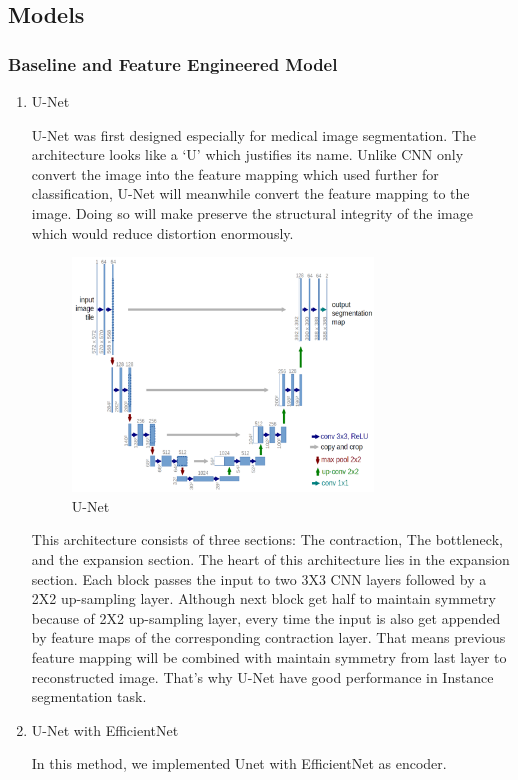 \documentclass[UTF8]{article}
\begin{document}
\subsection{Models}
	\subsubsection{Baseline and Feature Engineered Model}
	\begin{enumerate}
		\item U-Net\par
		\noindent U-Net was first designed especially for medical image segmentation. The architecture looks like a ‘U’ which justifies its name. Unlike CNN only convert the image into the feature mapping which used further for classification, U-Net will meanwhile convert the feature mapping to the image. Doing so will make preserve the structural integrity of the image which would reduce distortion enormously.\par
		\begin{figure}[h]
			\centering
			\includegraphics[width=8cm]{1.png}
			\caption{U-Net}
		\end{figure}
		\noindent This architecture consists of three sections: The contraction, The bottleneck, and the expansion section. The heart of this architecture lies in the expansion section. Each block passes the input to two 3X3 CNN layers followed by a 2X2 up-sampling layer. Although next block get half to maintain symmetry because of 2X2 up-sampling layer, every time the input is also get appended by feature maps of the corresponding contraction layer. That means previous feature mapping will be combined with maintain symmetry from last layer to reconstructed image. That’s why U-Net have good performance in Instance segmentation task.
		
		\item U-Net with EfficientNet\par
		\noindent In this method, we implemented Unet with EfficientNet as encoder.\par
		

\end{enumerate}
\end{document}
